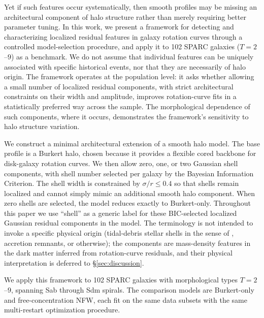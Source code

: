\documentclass[linenumbers]{aastex701}
\begin{document}
Yet if such features occur systematically, then smooth profiles may be missing an architectural component of halo structure rather than merely requiring better parameter tuning. In this work, we present a framework for detecting and characterizing localized residual features in galaxy rotation curves through a controlled model-selection procedure, and apply it to 102 SPARC galaxies ($T=2$--$9$) as a benchmark. We do not assume that individual features can be uniquely associated with specific historical events, nor that they are necessarily of halo origin. The framework operates at the population level: it asks whether allowing a small number of localized residual components, with strict architectural constraints on their width and amplitude, improves rotation-curve fits in a statistically preferred way across the sample. The morphological dependence of such components, where it occurs, demonstrates the framework's sensitivity to halo structure variation.

We construct a minimal architectural extension of a smooth halo model. The base profile is a Burkert halo, chosen because it provides a flexible cored backbone for disk-galaxy rotation curves. We then allow zero, one, or two Gaussian shell components, with shell number selected per galaxy by the Bayesian Information Criterion. The shell width is constrained by $\sigma/r \le 0.4$ so that shells remain localized and cannot simply mimic an additional smooth halo component. When zero shells are selected, the model reduces exactly to Burkert-only. Throughout this paper we use ``shell'' as a generic label for these BIC-selected localized Gaussian residual components in the model. The terminology is not intended to invoke a specific physical origin (tidal-debris stellar shells in the sense of \citealt{Helmi1999}, accretion remnants, or otherwise); the components are mass-density features in the dark matter inferred from rotation-curve residuals, and their physical interpretation is deferred to \S\ref{sec:discussion}.

We apply this framework to 102 SPARC \citep{Lelli2016} galaxies with morphological types $T=2$--$9$, spanning Sab through Sdm spirals. The comparison models are Burkert-only and free-concentration NFW, each fit on the same data subsets with the same multi-restart optimization procedure.
\end{document}
